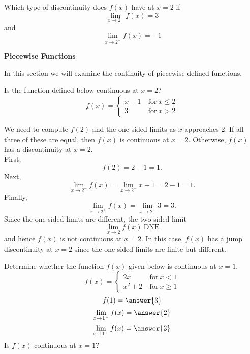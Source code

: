 \documentclass{ximera}
\begin{document}
\begin{problem} %
Which type of discontinuity does $f(x)$ have at $x=2$ if
\[
\lim_{x \to 2^-} f(x) = 3
\]
and
\[
\lim_{x \to 2^+} f(x) = -1
\]
\begin{multipleChoice}
\end{multipleChoice}
\end{problem}



\begin{center}
\textbf{Piecewise Functions}
\end{center}

In this section we will examine the continuity of piecewise defined functions.

\begin{example} %
Is the function defined below continuous at $x = 2$?
\[
f(x) = \left\{
     \begin{array}{lr}
       x-1 & \ \text{for} \  x \leq 2 \\
       3 & \ \text{for} \ x > 2
     \end{array}
   \right.
\]


We need to  compute $f(2)$ and the one-sided limits as $x$ approaches 2.
If all three of these are equal, then $f(x)$ is continuous at $x=2$.
Otherwise, $f(x)$ has a discontinuity at $x=2$.\\
First, 
\[
f(2) = 2-1 = 1.
\]
Next,  
\[\lim_{x \to 2^-} f(x) = \lim_{x \to 2^-} x-1 = 2-1 = 1.\]
Finally,
\[\lim_{x \to 2^+} f(x) = \lim_{x \to 2^+}3 = 3.\]
Since the one-sided limits are different, the two-sided limit
\[
\lim_{x \to 2} f(x) \ \text{DNE}
\]
and hence $f(x)$ is not continuous at $x = 2$.
In this case, $f(x)$ has a jump discontinuity at $x=2$ since the one-sided limits are finite but different.
\end{example}

\begin{problem} %
Determine whether the function $f(x)$ given below is continuous at $x = 1$.
\[
f(x) = \left\{
     \begin{array}{lr}
       2x & \ \text{for} \  x < 1 \\
       x^2 + 2 & \ \text{for} \ x \geq 1
     \end{array}
   \right.
\]
\[
f(1) = \answer{3}
\]
\[
\lim_{x \to 1^-} f(x) = \answer{2}
\]
\[
\lim_{x \to 1^+} f(x) = \answer{3}
\]
Is $f(x)$ continuous at $x = 1$?
\begin{multipleChoice}
\end{multipleChoice}
\end{problem}
\end{document}

